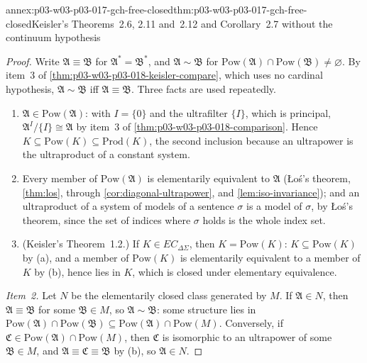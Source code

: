 \begin{annexitem}{annex:p03-w03-p03-017-gch-free-closed}{thm:p03-w03-p03-017-gch-free-closed}{Keisler's Theorems~2.6, 2.11 and~2.12 and Corollary~2.7 without the continuum hypothesis}
\begin{proof}
Write \(\mathfrak A\equiv\mathfrak B\) for \(\mathfrak A^*=\mathfrak B^*\),
and \(\mathfrak A\sim\mathfrak B\) for
\(\mathrm{Pow}(\mathfrak A)\cap\mathrm{Pow}(\mathfrak B)\neq\varnothing\).
By item~3 of \cref{thm:p03-w03-p03-018-keisler-compare}, which uses no
cardinal hypothesis, \(\mathfrak A\sim\mathfrak B\) iff
\(\mathfrak A\equiv\mathfrak B\).  Three facts are used repeatedly.
\begin{enumerate}
  \item[(a)] \(\mathfrak A\in\mathrm{Pow}(\mathfrak A)\): with
        \(I=\{0\}\) and the ultrafilter \(\{I\}\), which is principal,
        \(\mathfrak A^I/\{I\}\cong\mathfrak A\) by item~3 of
        \cref{thm:p03-w03-p03-018-comparison}.  Hence
        \(K\subseteq\mathrm{Pow}(K)\subseteq\mathrm{Prod}(K)\), the second
        inclusion because an ultrapower is the ultraproduct of a constant
        system.
  \item[(b)] Every member of \(\mathrm{Pow}(\mathfrak A)\) is elementarily
        equivalent to \(\mathfrak A\) (\L o\'s's theorem, \cref{thm:los},
        through \cref{cor:diagonal-ultrapower}, and
        \cref{lem:iso-invariance}); and an ultraproduct of a system of
        models of a sentence \(\sigma\) is a model of \(\sigma\), by
        \L o\'s's theorem, since the set of indices where \(\sigma\) holds
        is the whole index set.
  \item[(c)] (Keisler's Theorem~1.2.)  If \(K\in EC_{\Delta\Sigma}\), then
        \(K=\mathrm{Pow}(K)\): \(K\subseteq\mathrm{Pow}(K)\) by (a), and a
        member of \(\mathrm{Pow}(K)\) is elementarily equivalent to a member
        of \(K\) by (b), hence lies in \(K\), which is closed under
        elementary equivalence.
\end{enumerate}

\emph{Item~2.}  Let \(N\) be the elementarily closed class generated by
\(M\).  If \(\mathfrak A\in N\), then \(\mathfrak A\equiv\mathfrak B\) for
some \(\mathfrak B\in M\), so \(\mathfrak A\sim\mathfrak B\): some
structure lies in \(\mathrm{Pow}(\mathfrak A)\cap\mathrm{Pow}(\mathfrak B)
\subseteq\mathrm{Pow}(\mathfrak A)\cap\mathrm{Pow}(M)\).  Conversely, if
\(\mathfrak C\in\mathrm{Pow}(\mathfrak A)\cap\mathrm{Pow}(M)\), then
\(\mathfrak C\) is isomorphic to an ultrapower of some
\(\mathfrak B\in M\), and \(\mathfrak A\equiv\mathfrak C\equiv\mathfrak B\)
by (b), so \(\mathfrak A\in N\).


\end{proof}
\end{annexitem}
